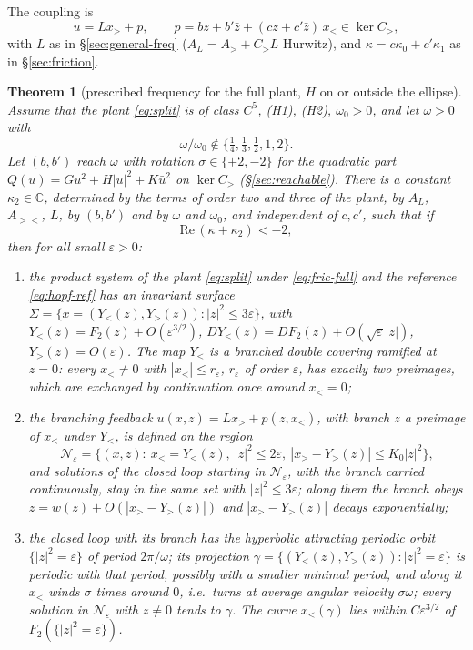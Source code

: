 \documentclass[11pt,reqno]{amsart}
\theoremstyle{plain}
\newtheorem*{theorem}{Theorem}
\theoremstyle{definition}
\theoremstyle{remark}
\newcommand{\C}{\mathbb{C}}
\begin{document}
The coupling is
\begin{equation}\label{eq:fric-full}
  u=Lx_>+p,\qquad p=bz+b'\bar z+(cz+c'\bar z)\,x_<\in\ker C_>,
\end{equation}
with $L$ as in \S\ref{sec:general-freq} ($A_L=A_>+C_>L$ Hurwitz), and $\kappa=c\kappa_0+c'\kappa_1$ as in
\S\ref{sec:friction}.

\begin{theorem}[prescribed frequency for the full plant, $H$ on or outside the ellipse]\label{thm:friction-full}
Assume that the plant \eqref{eq:split} is of class $C^{5}$, \textup{(H1)}, \textup{(H2)}, $\omega_0>0$, and let $\omega>0$ with
\[
  \omega/\omega_0\notin\bigl\{\tfrac14,\tfrac13,\tfrac12,1,2\bigr\}.
\]
Let $(b,b')$ reach $\omega$ with rotation $\sigma\in\{+2,-2\}$ for the quadratic part $Q(u)=Gu^{2}+H|u|^{2}+K\bar u^{2}$
on $\ker C_>$ \textup{(}\S\ref{sec:reachable}\textup{)}. There is a constant $\kappa_2\in\C$, determined by the terms of
order two and three of the plant, by $A_L$, $A_{><}$, $L$, by $(b,b')$ and by $\omega$ and $\omega_0$, and independent of $c,c'$, such that if
\[
  \mathrm{Re}\,(\kappa+\kappa_2)<-2 ,
\]
then for all small $\varepsilon>0$:
\begin{enumerate}
\item[\textup{(i)}] the product system of the plant \eqref{eq:split} under \eqref{eq:fric-full} and the reference
  \eqref{eq:hopf-ref} has an invariant surface $\Sigma=\{x=(Y_<(z),Y_>(z)):|z|^{2}\le3\varepsilon\}$, with
  $Y_<(z)=F_2(z)+O(\varepsilon^{3/2})$, $DY_<(z)=DF_2(z)+O(\sqrt\varepsilon|z|)$, $Y_>(z)=O(\varepsilon)$. The map $Y_<$ is a
  branched double covering ramified at $z=0$: every $x_<\ne0$ with $|x_<|\le r_\varepsilon$, $r_\varepsilon$ of order $\varepsilon$, has
  exactly two preimages, which are exchanged by continuation once around $x_<=0$;
\item[\textup{(ii)}] the branching feedback $u(x,z)=Lx_>+p(z,x_<)$, with branch $z$ a preimage of $x_<$ under $Y_<$, is defined
  on the region
  \[
    \mathcal N_\varepsilon=\bigl\{(x,z):\ x_<=Y_<(z),\ |z|^{2}\le2\varepsilon,\ |x_>-Y_>(z)|\le K_0|z|^{2}\bigr\},
  \]
  and solutions of the closed loop starting in $\mathcal N_\varepsilon$, with the branch carried continuously, stay in the same set
  with $|z|^{2}\le3\varepsilon$; along them the branch obeys $\dot z=w(z)+O(|x_>-Y_>(z)|)$ and $|x_>-Y_>(z)|$ decays exponentially;
\item[\textup{(iii)}] the closed loop with its branch has the hyperbolic attracting periodic orbit $\{|z|^{2}=\varepsilon\}$ of
  period $2\pi/\omega$; its projection $\gamma=\{(Y_<(z),Y_>(z)):|z|^{2}=\varepsilon\}$ is periodic with that period, possibly
  with a smaller minimal period, and along it $x_<$ winds $\sigma$ times around $0$, i.e.\ turns at average angular velocity $\sigma\omega$;
  every solution in $\mathcal N_\varepsilon$ with $z\ne0$ tends to $\gamma$. The curve $x_<(\gamma)$ lies within $C\varepsilon^{3/2}$ of
  $F_2(\{|z|^{2}=\varepsilon\})$.
\end{enumerate}
\end{theorem}
\end{document}
